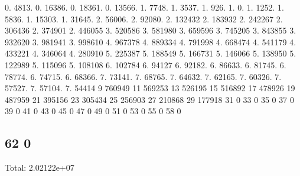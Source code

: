 0. 4813. 0. 16386. 0. 18361. 0. 13566. 1. 7748. 1. 3537. 1. 926. 1. 0. 1. 1252. 1. 5836. 1. 15303. 1. 31645. 2. 56006. 2. 92080. 2. 132432 2. 183932 2. 242267 2. 306436 2. 374901 2. 446055 3. 520586 3. 581980 3. 659596 3. 745205 3. 843855 3. 932620 3. 981941 3. 998610 4. 967378 4. 889334 4. 791998 4. 668474 4. 541179 4. 433221 4. 346064 4. 280910 5. 225387 5. 188549 5. 166731 5. 146066 5. 138950 5. 122989 5. 115096 5. 108108 6. 102784 6. 94127 6. 92182. 6. 86633. 6. 81745. 6. 78774. 6. 74715. 6. 68366. 7. 73141. 7. 68765. 7. 64632. 7. 62165. 7. 60326. 7. 57527. 7. 57104. 7. 54414 9 760949 11 569253 13 526195 15 516892 17 478926 19 487959 21 395156 23 305434 25 256903 27 210868 29 177918 31 0 33 0 35 0 37 0 39 0 41 0 43 0 45 0 47 0 49 0 51 0 53 0 55 0 58 0 \subsection*{62 0 }

Total\+: 2.\+02122e+07 